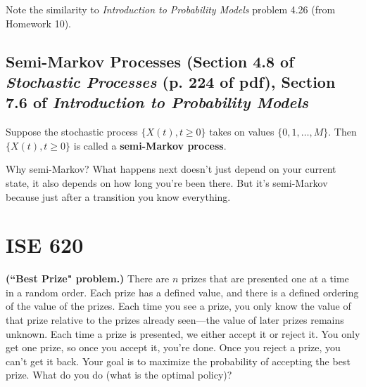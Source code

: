 \begin{example}

Note the similarity to \textit{Introduction to Probability Models} problem 4.26 (from Homework 10).

\end{example}

\subsection{Semi-Markov Processes (Section 4.8 of \textit{Stochastic Processes} (p. 224 of pdf), Section 7.6 of \textit{Introduction to Probability Models}}

\begin{definition}Suppose the stochastic process \(\{X(t), t \geq 0\}\) takes on values \(\{0, 1, \ldots, M\}\). Then \(\{X(t), t \geq 0\}\) is called a \textbf{semi-Markov process}. 

\end{definition}

Why semi-Markov? What happens next doesn't just depend on your current state, it also depends on how long you're been there. But it's semi-Markov because just after a transition you know everything.
\section{ISE 620}


\begin{exercise} \textbf{(``Best Prize" problem.)} There are \(n\) prizes that are presented one at a time in a random order. Each prize has a defined value, and there is a defined ordering of the value of the prizes. Each time you see a prize, you only know the value of that prize relative to the prizes already seen---the value of later prizes remains unknown. Each time a prize is presented, we either accept it or reject it. You only get one prize, so once you accept it, you're done. Once you reject a prize, you can't get it back. Your goal is to maximize the probability of accepting the best prize. What do you do (what is the optimal policy)?

\end{exercise}

